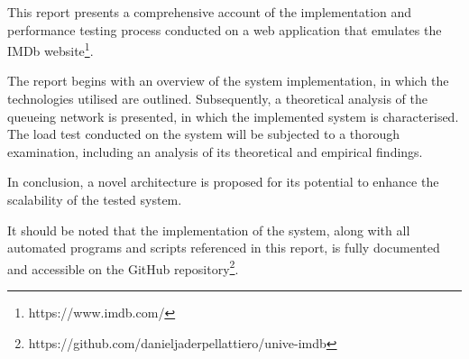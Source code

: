 This report presents a comprehensive account of the implementation and performance testing process conducted on a web application that emulates the IMDb website\footnote[1]{https://www.imdb.com/}.

The report begins with an overview of the system implementation, in which the technologies utilised are outlined. Subsequently, a theoretical analysis of the queueing network is presented, in which the implemented system is characterised.
The load test conducted on the system will be subjected to a thorough examination, including an analysis of its theoretical and empirical findings.

In conclusion, a novel architecture is proposed for its potential to enhance the scalability of the tested system.

It should be noted that the implementation of the system, along with all automated programs and scripts referenced in this report, is fully documented and accessible on the GitHub repository\footnote[2]{https://github.com/danieljaderpellattiero/unive-imdb}.
